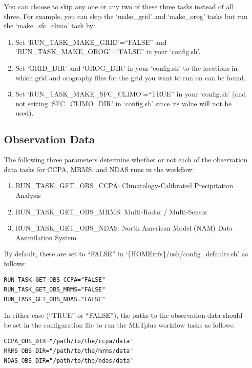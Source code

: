 \documentclass[11pt,fleqn]{report}              %
\begin{document}
You can choose to skip any one or any two of these three tasks instead of all three.  For example, you can skip the `make\_grid' and `make\_orog' tasks but run the `make\_sfc\_climo' task by:
\begin{enumerate}
\item Set `RUN\_TASK\_MAKE\_GRID'=``FALSE'' and `RUN\_TASK\_MAKE\_OROG'=``FALSE'' in your `config.sh'.
\item Set `GRID\_DIR' and `OROG\_DIR' in your `config.sh' to the locations in which grid and orography files for the grid you want to run on can be found.
\item Set `RUN\_TASK\_MAKE\_SFC\_CLIMO'=``TRUE'' in your `config.sh' (and not setting `SFC\_CLIMO\_DIR' in `config.sh' since its value will not be used).
\end{enumerate}



\subsection{Observation Data}
\label{subsec:turn_observation_tasks}

The following three parameters determine whether or not each of the observation data tasks for CCPA, MRMS, and NDAS runs in the workflow:
\begin{enumerate}
\item RUN\_TASK\_GET\_OBS\_CCPA: Climatology-Calibrated Precipitation Analysis 
\item RUN\_TASK\_GET\_OBS\_MRMS: Multi-Radar / Multi-Sensor
\item RUN\_TASK\_GET\_OBS\_NDAS: North American Model (NAM) Data Assimilation System
\end{enumerate}

By default, these are set to ``FALSE'' in `\{HOMErrfs\}/ush/config\_defaults.sh' as follows:
\lstset{language=bash}   
\begin{lstlisting}[frame=trBL]
RUN_TASK_GET_OBS_CCPA="FALSE"
RUN_TASK_GET_OBS_MRMS="FALSE"
RUN_TASK_GET_OBS_NDAS="FALSE"
\end{lstlisting}

In either case (``TRUE'' or ``FALSE''), the paths to the observation data should be set in the configuration file to run the METplus workflow tasks as follows:
\lstset{language=bash}   
\begin{lstlisting}[frame=trBL]
CCPA_OBS_DIR="/path/to/the/ccpa/data"
MRMS_OBS_DIR="/path/to/the/mrms/data"
NDAS_OBS_DIR="/path/to/the/ndas/data"
\end{lstlisting}
\end{document}

